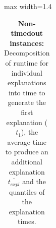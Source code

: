 \begin{landscape}
\begin{table}[!h]
\begin{adjustbox}{max width=1.4\textwidth}
\begin{tabular}{r|c|c|cccccc|c|c|cccccc}
			\end{tabular}
		\end{adjustbox}
		\caption{\textbf{Non-timedout instances:} Decomposition of runtime for individual explanations into time to generate the first explanation ($t_1$), the average time to produce an additional explanation $\overline{t_{expl}}$ and the quantiles of the explanation times.}
		\label{tab:indiv-explanations-all}
	\end{table}
	\vspace*{\fill}
\end{landscape}

